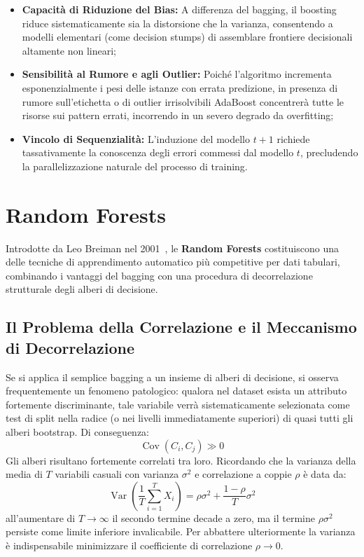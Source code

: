 \begin{itemize}
    \item \textbf{Capacità di Riduzione del Bias:} A differenza del bagging, il boosting riduce sistematicamente sia la distorsione che la varianza, consentendo a modelli elementari (come decision stumps) di assemblare frontiere decisionali altamente non lineari;
    \item \textbf{Sensibilità al Rumore e agli Outlier:} Poiché l'algoritmo incrementa esponenzialmente i pesi delle istanze con errata predizione, in presenza di rumore sull'etichetta o di outlier irrisolvibili AdaBoost concentrerà tutte le risorse sui pattern errati, incorrendo in un severo degrado da overfitting;
    \item \textbf{Vincolo di Sequenzialità:} L'induzione del modello $t+1$ richiede tassativamente la conoscenza degli errori commessi dal modello $t$, precludendo la parallelizzazione naturale del processo di training.
\end{itemize}

\FloatBarrier
\section{Random Forests}
\label{sec:dm-random-forests}

Introdotte da Leo Breiman nel 2001~\cite{breiman2001random}, le \textbf{Random Forests} costituiscono una delle tecniche di apprendimento automatico più competitive per dati tabulari, combinando i vantaggi del bagging con una procedura di decorrelazione strutturale degli alberi di decisione.

\FloatBarrier
\subsection{Il Problema della Correlazione e il Meccanismo di Decorrelazione}
\label{subsec:dm-rf-decorrelation}

Se si applica il semplice bagging a un insieme di alberi di decisione, si osserva frequentemente un fenomeno patologico: qualora nel dataset esista un attributo fortemente discriminante, tale variabile verrà sistematicamente selezionata come test di split nella radice (o nei livelli immediatamente superiori) di quasi tutti gli alberi bootstrap. Di conseguenza:
\begin{equation}
    \operatorname{Cov}(C_i, C_j) \gg 0
\end{equation}
Gli alberi risultano fortemente correlati tra loro. Ricordando che la varianza della media di $T$ variabili casuali con varianza $\sigma^2$ e correlazione a coppie $\rho$ è data da:
\begin{equation}
    \operatorname{Var}\left(\frac{1}{T}\sum_{i=1}^T X_i\right) = \rho \sigma^2 + \frac{1 - \rho}{T} \sigma^2
    \label{eq:dm-ensemble-variance-reduction}
\end{equation}
all'aumentare di $T \to \infty$ il secondo termine decade a zero, ma il termine $\rho \sigma^2$ persiste come limite inferiore invalicabile. Per abbattere ulteriormente la varianza è indispensabile minimizzare il coefficiente di correlazione $\rho \to 0$.

